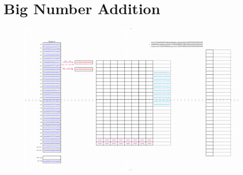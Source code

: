 \section*{Big Number Addition}



\begin{figure}[h!]\centering
	\includegraphics[width=1.5\textwidth]{architectures/bn_add.pdf}
\end{figure}